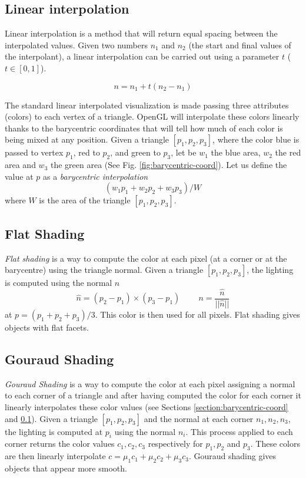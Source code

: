 \subsection{Linear interpolation}\label{section:linear-interpolation}
Linear interpolation is a method that will return equal spacing between the interpolated values. Given two numbers $n_1$ and $n_2$ (the start and final values of the interpolant), a linear interpolation can be carried out using a parameter $t$ ($t \in [0,1]$). \cite{WEBSITE:interpolation}

$$ n = n_1 + t (n_2 - n_1)$$


The standard linear interpolated visualization is made passing three attributes (colors) to each vertex of a triangle. OpenGL will interpolate these colors linearly thanks to the barycentric coordinates that will tell how much of each color is being mixed at any position.
Given a triangle $[p_1, p_2, p_3]$, where the color blue is passed to vertex $p_1$, red to $p_2$, and green to $p_3$, let be $w_1$ the blue area, $w_2$ the red area and $w_3$ the green area (See Fig. \ref{fig:barycentric-coord}). Let us define the value at $p$ as a \textit{barycentric interpolation} $$(w_1p_1 + w_2p_2 + w_3p_3)/W$$ where $W$ is the area of the triangle $[p_1, p_2, p_3]$.


\subsection{Flat Shading}
\textit{Flat shading} is a way to compute the color at each pixel (at a corner or at the barycentre) using the triangle normal.
Given a triangle $[p_1, p_2, p_3]$, the lighting is computed using the normal $n$ $$\widehat{n} = (p_2 - p_1) \times (p_3 - p_1) \;\;\;\;\;\;\;\; n = \frac{ \widehat{n} } { ||\widehat{n}|| } $$ at $p= (p_1 + p_2 + p_3)/3$. This color is then used for all pixels. Flat shading gives objects with flat facets.
\cite{SLIDE:ICORSI}

\subsection{Gouraud Shading}
\textit{Gouraud Shading} is a way to compute the color at each pixel assigning a normal to each corner of a triangle and after having computed the color for each corner it linearly interpolates these color values (see Sections \ref{section:barycentric-coord} and \ref{section:linear-interpolation}).
Given a triangle $[p_1, p_2, p_3]$ and the normal at each corner $n_1, n_2, n_3$, the lighting is computed at $p_i$ using the normal $n_i$. This process applied to each corner returns the color values $c_1, c_2, c_3$ respectively for $p_1, p_2$ and $p_3$.
These colors are then linearly interpolate $c = {\mu}_1 c_1 + {\mu}_2 c_2 + {\mu}_3 c_3$. Gouraud shading gives objects that appear more smooth. \cite{SLIDE:ICORSI}



